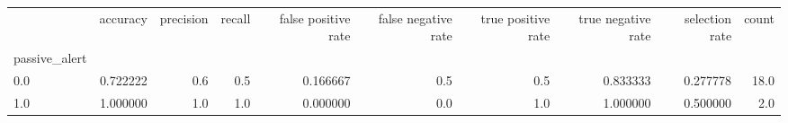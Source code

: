 \begin{tabular}{lrrrrrrrrr}
\toprule
{} &  accuracy &  precision &  recall &  false positive rate &  false negative rate &  true positive rate &  true negative rate &  selection rate &  count \\
passive\_alert &           &            &         &                      &                      &                     &                     &                 &        \\
\midrule
0.0           &  0.722222 &        0.6 &     0.5 &             0.166667 &                  0.5 &                 0.5 &            0.833333 &        0.277778 &   18.0 \\
1.0           &  1.000000 &        1.0 &     1.0 &             0.000000 &                  0.0 &                 1.0 &            1.000000 &        0.500000 &    2.0 \\
\bottomrule
\end{tabular}
